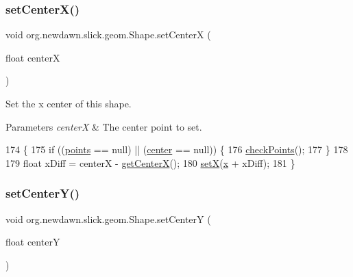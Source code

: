 \subsubsection{\texorpdfstring{set\+Center\+X()}{setCenterX()}}
{\footnotesize\ttfamily void org.\+newdawn.\+slick.\+geom.\+Shape.\+set\+CenterX (\begin{DoxyParamCaption}\item[{float}]{centerX }\end{DoxyParamCaption})\hspace{0.3cm}{\ttfamily [inline]}}

Set the x center of this shape.


\begin{DoxyParams}{Parameters}
{\em centerX} & The center point to set. \\
\hline
\end{DoxyParams}

\begin{DoxyCode}
174                                           \{
175         \textcolor{keywordflow}{if} ((\mbox{\hyperlink{classorg_1_1newdawn_1_1slick_1_1geom_1_1_shape_a8b4d4058734bbb3b96072e470b92aa37}{points}} == null) || (\mbox{\hyperlink{classorg_1_1newdawn_1_1slick_1_1geom_1_1_shape_a15ecde3336c4310cd927d766bb9a0b3b}{center}} == null)) \{
176             \mbox{\hyperlink{classorg_1_1newdawn_1_1slick_1_1geom_1_1_shape_a84293802d05e8666a441720bfc12745d}{checkPoints}}();
177         \}
178         
179         \textcolor{keywordtype}{float} xDiff = centerX - \mbox{\hyperlink{classorg_1_1newdawn_1_1slick_1_1geom_1_1_shape_aa8f8cb519727d4ef8737819b4f1dd7b6}{getCenterX}}();
180         \mbox{\hyperlink{classorg_1_1newdawn_1_1slick_1_1geom_1_1_shape_a1469b8ef682642c4257869640c27bf16}{setX}}(\mbox{\hyperlink{classorg_1_1newdawn_1_1slick_1_1geom_1_1_shape_a3e985bfff386c15a4efaad03d8ad60d3}{x}} + xDiff);
181     \}
\end{DoxyCode}
\mbox{\label{classorg_1_1newdawn_1_1slick_1_1geom_1_1_shape_ad9ff9a26b4cb2799696bdc938965b2fc}} 
\subsubsection{\texorpdfstring{set\+Center\+Y()}{setCenterY()}}
{\footnotesize\ttfamily void org.\+newdawn.\+slick.\+geom.\+Shape.\+set\+CenterY (\begin{DoxyParamCaption}\item[{float}]{centerY }\end{DoxyParamCaption})\hspace{0.3cm}{\ttfamily [inline]}}


